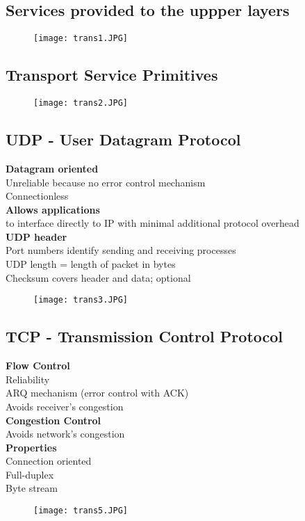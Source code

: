\documentclass[../resumosRCOM.tex]{subfiles}
\begin{document}
\subsection{Services provided to the uppper layers}

\begin{figure}[h]
    \centering
    \texttt{[image: trans1.JPG]}
\end{figure}

\subsection{Transport Service Primitives}
\begin{figure}[h]
    \centering
    \texttt{[image: trans2.JPG]}
\end{figure}

\subsection{UDP - User Datagram Protocol}
\textbf{Datagram oriented} \\
Unreliable because no error control mechanism\\ 
Connectionless\\
\textbf{Allows applications} \\
to interface directly to IP with minimal additional protocol overhead\\
\textbf{UDP header} \\
Port numbers identify sending and receiving processes \\
UDP length = length of packet in bytes \\
Checksum covers header and data; optional \\
\begin{figure}
    \centering
    \texttt{[image: trans3.JPG]}
\end{figure}

\subsection{TCP - Transmission Control Protocol}
\textbf{Flow Control}\\
Reliability\\
ARQ mechanism (error control with ACK)\\
Avoids receiver's congestion\\
\textbf{Congestion Control}\\
Avoids network's congestion\\
\textbf{Properties}\\
Connection oriented\\
Full-duplex\\
Byte stream\\
\begin{figure}[h]
    \centering
    \texttt{[image: trans5.JPG]}
\end{figure}
\end{document}
